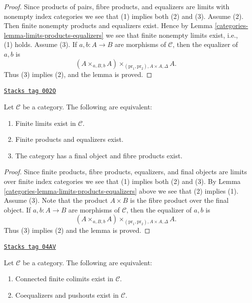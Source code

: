 \begin{proof}

Since products of pairs, fibre products, and equalizers are limits with
nonempty index categories we see that (1) implies both (2) and (3).
Assume (2). Then finite nonempty products and equalizers exist. Hence by
Lemma \ref{categories-lemma-limits-products-equalizers}
we see that finite nonempty limits exist, i.e., (1) holds. Assume (3).
If $a, b : A \to B$ are morphisms of $\mathcal{C}$, then the
equalizer of $a, b$ is
$$
(A \times_{a, B, b} A)\times_{(\text{pr}_1, \text{pr}_2), A \times A, \Delta} A.
$$
Thus (3) implies (2), and the lemma is proved.
\end{proof}

\begin{lemma}
\label{categories-lemma-finite-limits-exist}
\href{https://stacks.math.columbia.edu/tag/002O}{\texttt{Stacks tag 002O}}

Let $\mathcal{C}$ be a category.
The following are equivalent:
\begin{enumerate}
\item Finite limits exist in $\mathcal{C}$.
\item Finite products and equalizers exist.
\item The category has a final object and fibre products exist.
\end{enumerate}
\end{lemma}

\begin{proof}

Since finite products, fibre products, equalizers, and final objects
are limits over finite index categories we see that (1) implies both (2)
and (3). By
Lemma \ref{categories-lemma-limits-products-equalizers}
above we see that (2) implies (1). Assume (3).
Note that the product $A \times B$ is the fibre product over the
final object. If $a, b : A \to B$ are morphisms of $\mathcal{C}$, then the
equalizer of $a, b$ is
$$
(A \times_{a, B, b} A)\times_{(\text{pr}_1, \text{pr}_2), A \times A, \Delta} A.
$$
Thus (3) implies (2) and the lemma is proved.
\end{proof}

\begin{lemma}
\label{categories-lemma-push-outs-coequalizers-exist}
\href{https://stacks.math.columbia.edu/tag/04AV}{\texttt{Stacks tag 04AV}}

Let $\mathcal{C}$ be a category.
The following are equivalent:
\begin{enumerate}
\item Connected finite colimits exist in $\mathcal{C}$.
\item Coequalizers and pushouts exist in $\mathcal{C}$.
\end{enumerate}
\end{lemma}

